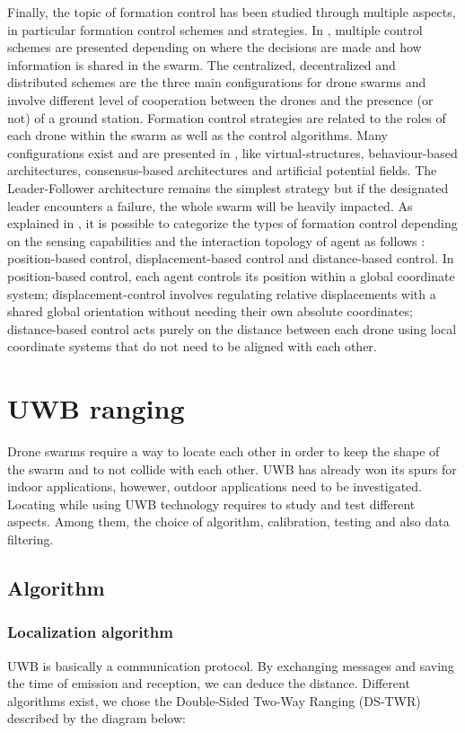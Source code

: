 \documentclass[conference]{IEEEtran}
\begin{document}
Finally, the topic of formation control has been studied through multiple aspects, in particular formation control schemes and strategies. In \parencite{bu_2024}, multiple control schemes are presented depending on where the decisions are made and how information is shared in the swarm. The centralized, decentralized and distributed schemes are the three main configurations for drone swarms and involve different level of cooperation between the drones and the presence (or not) of a ground station. Formation control strategies are related to the roles of each drone within the swarm as well as the control algorithms. Many configurations exist and are presented in \parencite{bu_2024}, like virtual-structures, behaviour-based architectures, consensus-based architectures and artificial potential fields. The Leader-Follower architecture remains the simplest strategy but if the designated leader encounters a failure, the whole swarm will be heavily impacted. As explained in \parencite{oh_survey_2015}, it is possible to categorize the types of formation control depending on the sensing capabilities and the interaction topology of agent as follows : position-based control, displacement-based control and distance-based control. In position-based control, each agent controls its position within a global coordinate system; displacement-control involves regulating relative displacements with a shared global orientation without needing their own absolute coordinates; distance-based control acts purely on the distance between each drone using local coordinate systems that do not need to be aligned with each other.



\section{UWB ranging}
Drone swarms require a way to locate each other in order to keep the shape of the swarm and to not collide with each other. UWB has already won its spurs for indoor applications, howewer, outdoor applications need to be investigated. Locating while using UWB technology requires to study and test different aspects. Among them, the choice of algorithm, calibration, testing and also data filtering.

\subsection{Algorithm}

\subsubsection{Localization algorithm}
UWB is basically a communication protocol. By exchanging messages and saving
the time of emission and reception, we can deduce the distance. Different
algorithms exist, we chose the Double-Sided Two-Way Ranging (DS-TWR)
described by the diagram below:
\end{document}
